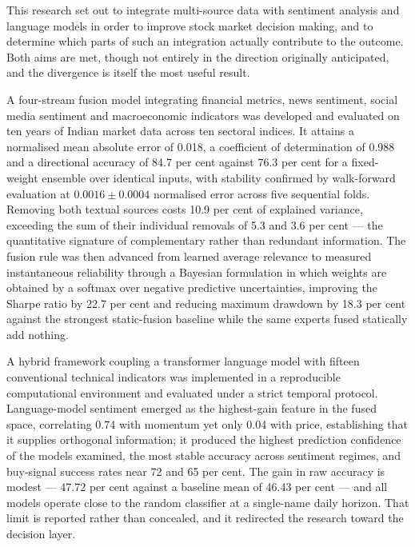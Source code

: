 This research set out to integrate multi-source data with sentiment analysis and language models
in order to improve stock market decision making, and to determine which parts of such an
integration actually contribute to the outcome. Both aims are met, though not entirely in the
direction originally anticipated, and the divergence is itself the most useful result.

A four-stream fusion model integrating financial metrics, news sentiment, social media sentiment
and macroeconomic indicators was developed and evaluated on ten years of Indian market data across
ten sectoral indices. It attains a normalised mean absolute error of 0.018, a coefficient of
determination of 0.988 and a directional accuracy of 84.7 per cent against 76.3 per cent for a
fixed-weight ensemble over identical inputs, with stability confirmed by walk-forward evaluation
at $0.0016 \pm 0.0004$ normalised error across five sequential folds. Removing both textual sources
costs 10.9 per cent of explained variance, exceeding the sum of their individual removals of 5.3
and 3.6 per cent --- the quantitative signature of complementary rather than redundant information.
The fusion rule was then advanced from learned average relevance to measured instantaneous
reliability through a Bayesian formulation in which weights are obtained by a softmax over negative
predictive uncertainties, improving the Sharpe ratio by 22.7 per cent and reducing maximum drawdown
by 18.3 per cent against the strongest static-fusion baseline while the same experts fused
statically add nothing.

A hybrid framework coupling a transformer language model with fifteen conventional technical
indicators was implemented in a reproducible computational environment and evaluated under a strict
temporal protocol. Language-model sentiment emerged as the highest-gain feature in the fused space,
correlating 0.74 with momentum yet only 0.04 with price, establishing that it supplies orthogonal
information; it produced the highest prediction confidence of the models examined, the most stable
accuracy across sentiment regimes, and buy-signal success rates near 72 and 65 per cent. The gain
in raw accuracy is modest --- 47.72 per cent against a baseline mean of 46.43 per cent --- and all
models operate close to the random classifier at a single-name daily horizon. That limit is
reported rather than concealed, and it redirected the research toward the decision layer.

